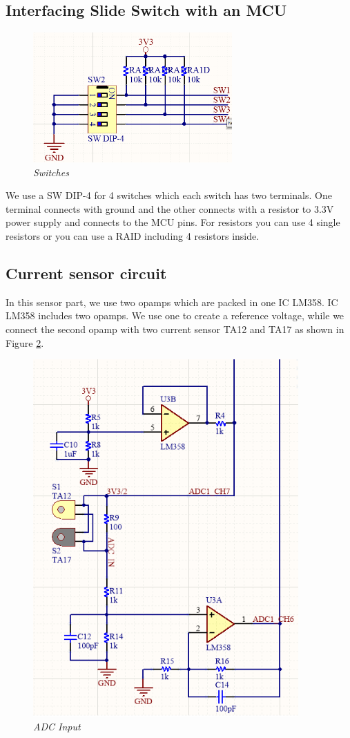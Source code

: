 \subsection{Interfacing Slide Switch with an MCU}
\begin{figure}[!htp]
    \centering
    \includegraphics[width=3in]{source/picture/bai_7/bai7_switches.png}
    \caption{\textit{Switches}}
    \label{bai7_switches}
\end{figure}
We use a SW DIP-4 for 4 switches which each switch has two terminals. One terminal connects with ground and the other connects with a resistor to 3.3V power supply and connects to the MCU pins. For resistors you can use 4 single resistors or you can use a RAID including 4 resistors inside.

\newpage
\subsection{Current sensor circuit}
In this sensor part, we use two opamps which are packed in one IC LM358. IC LM358 includes two opamps. We use one to create a reference voltage, while we connect the second opamp with two current sensor TA12 and TA17 as shown in Figure \ref{bai7_ADC_Input}.
\begin{figure}[!htp]
    \centering
    \includegraphics[width=4in]{source/picture/bai_7/bai7_ADC_Input.png}
    \caption{\textit{ADC Input}}
    \label{bai7_ADC_Input}
\end{figure}


